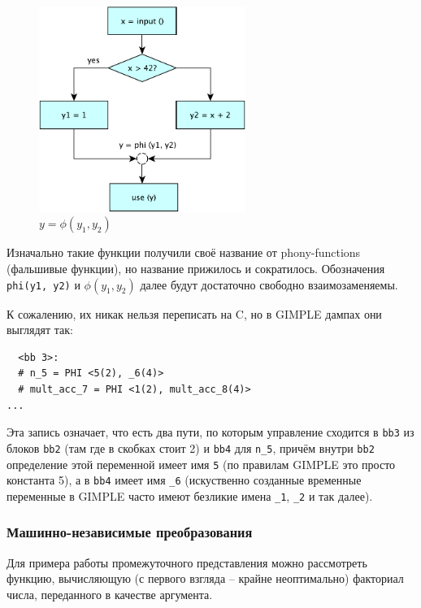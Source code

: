 \documentclass[a4paper,12pt,oneside]{article}
\begin{document}
\begin{figure}[h!]
\centering
\includegraphics[width=0.6\textwidth]{illustrations/ssa-romb-crop.pdf}
\caption{$y = \phi(y_1, y_2)$}
\label{fig:ssa_romb_scheme}
\end{figure}

Изначально такие функции получили своё название от phony-functions (фальшивые функции), но название прижилось и сократилось. Обозначения \lstinline!phi(y1, y2)! и $\phi(y_1, y_2)$ далее будут достаточно свободно взаимозаменяемы.

К сожалению, их никак нельзя переписать на C, но в GIMPLE дампах они выглядят так:

\begin{lstlisting}
  <bb 3>:
  # n_5 = PHI <5(2), _6(4)>
  # mult_acc_7 = PHI <1(2), mult_acc_8(4)>
...
\end{lstlisting}

Эта запись означает, что есть два пути, по которым управление сходится в \lstinline!bb3! из блоков \lstinline!bb2! (там где в скобках стоит 2) и \lstinline!bb4! для \lstinline!n_5!, причём внутри \lstinline!bb2! определение этой переменной имеет имя \lstinline!5! (по правилам GIMPLE это просто константа 5), а в \lstinline!bb4! имеет имя \lstinline!_6! (искуственно созданные временные переменные в GIMPLE часто имеют безликие имена \lstinline!_1!, \lstinline!_2! и так далее).

\subsubsection{Машинно-независимые преобразования}\label{subsubsec:MITrans}

Для примера работы промежуточного представления можно рассмотреть функцию, вычисляющую (с первого взгляда -- крайне неоптимально) факториал числа, переданного в качестве аргумента.
\end{document}
